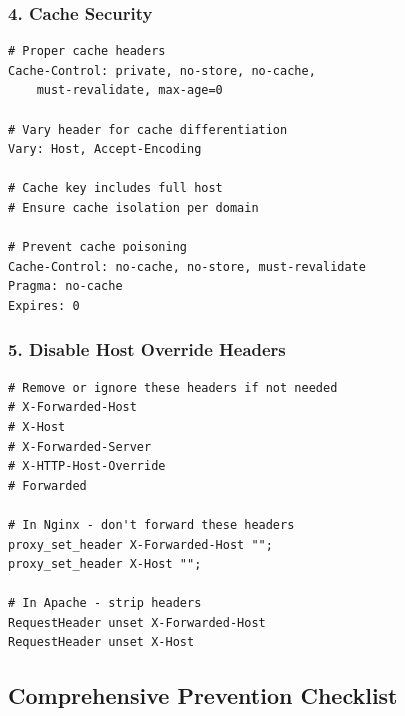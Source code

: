 \documentclass[12pt,a4paper]{article}
\begin{document}
\subsubsection{4. Cache Security}

\begin{lstlisting}[caption=Cache Security]
# Proper cache headers
Cache-Control: private, no-store, no-cache, 
    must-revalidate, max-age=0

# Vary header for cache differentiation
Vary: Host, Accept-Encoding

# Cache key includes full host
# Ensure cache isolation per domain

# Prevent cache poisoning
Cache-Control: no-cache, no-store, must-revalidate
Pragma: no-cache
Expires: 0
\end{lstlisting}

\subsubsection{5. Disable Host Override Headers}
\begin{lstlisting}[caption=Disable Override Headers]
# Remove or ignore these headers if not needed
# X-Forwarded-Host
# X-Host
# X-Forwarded-Server
# X-HTTP-Host-Override
# Forwarded

# In Nginx - don't forward these headers
proxy_set_header X-Forwarded-Host "";
proxy_set_header X-Host "";

# In Apache - strip headers
RequestHeader unset X-Forwarded-Host
RequestHeader unset X-Host
\end{lstlisting}

\subsection{Comprehensive Prevention Checklist}
\end{document}
